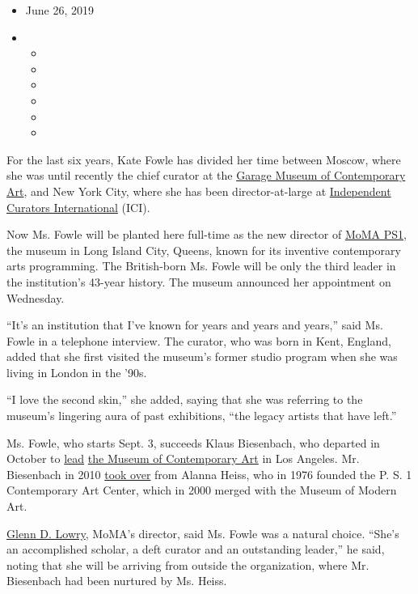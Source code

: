 \begin{itemize}
\item
  June 26, 2019
\item
  \begin{itemize}
  \item
  \item
  \item
  \item
  \item
  \item
  \end{itemize}
\end{itemize}

For the last six years, Kate Fowle has divided her time between Moscow,
where she was until recently the chief curator at the
\href{https://garagemca.org/en}{Garage Museum of Contemporary Art}, and
New York City, where she has been director-at-large at
\href{http://curatorsintl.org/}{Independent Curators International}
(ICI).

Now Ms. Fowle will be planted here full-time as the new director of
\href{https://www.nytimes3xbfgragh.onion/topic/organization/moma-ps1}{MoMA
PS1}, the museum in Long Island City, Queens, known for its inventive
contemporary arts programming. The British-born Ms. Fowle will be only
the third leader in the institution's 43-year history. The museum
announced her appointment on Wednesday.

``It's an institution that I've known for years and years and years,''
said Ms. Fowle in a telephone interview. The curator, who was born in
Kent, England, added that she first visited the museum's former studio
program when she was living in London in the '90s.

``I love the second skin,'' she added, saying that she was referring to
the museum's lingering aura of past exhibitions, ``the legacy artists
that have left.''

Ms. Fowle, who starts Sept. 3, succeeds Klaus Biesenbach, who departed
in October to
\href{https://www.nytimes3xbfgragh.onion/2018/07/31/arts/moca-turns-to-new-york-again-to-direct-its-next-chapter.html}{lead}
\href{https://www.moca.org/}{the Museum of Contemporary Art} in Los
Angeles. Mr. Biesenbach in 2010
\href{https://www.nytimes3xbfgragh.onion/2009/10/22/arts/design/22museum.html}{took
over} from Alanna Heiss, who in 1976 founded the P. S. 1 Contemporary
Art Center, which in 2000 merged with the Museum of Modern Art.

\href{https://www.nytimes3xbfgragh.onion/2018/11/16/arts/design/moma-glenn-lowry.html}{Glenn
D. Lowry}, MoMA's director, said Ms. Fowle was a natural choice. ``She's
an accomplished scholar, a deft curator and an outstanding leader,'' he
said, noting that she will be arriving from outside the organization,
where Mr. Biesenbach had been nurtured by Ms. Heiss.

